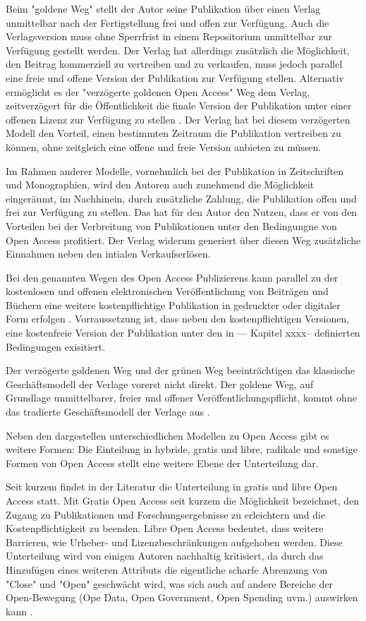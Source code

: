 Beim "goldene Weg" stellt der Autor seine Publikation über einen Verlag unmittelbar nach der Fertigstellung frei und offen zur Verfügung. Auch die Verlagsversion muss ohne Sperrfrist in einem Repositorium unmittelbar zur Verfügung gestellt werden. Der Verlag hat allerdings zusätzlich die Möglichkeit, den Beitrag kommerziell zu vertreiben und zu verkaufen, muss jedoch parallel eine freie und offene Version der Publikation zur Verfügung stellen. Alternativ ermöglicht es der "verzögerte goldenen Open Access" Weg dem Verlag, zeitverzögert für die Öffentlichkeit die finale Version der Publikation unter einer offenen Lizenz zur Verfügung zu stellen \cite{lewis_2012_inevitability}. Der Verlag hat bei diesem verzögerten Modell den Vorteil, einen bestimmten Zeitraum die Publikation vertreiben zu können, ohne zeitgleich eine offene und freie Version anbieten zu müssen.

Im Rahmen anderer Modelle, vornehmlich bei der Publikation in Zeitschriften und Monographien, wird den Autoren auch zunehmend die Möglichkeit eingeräumt, im Nachhinein, durch zusätzliche Zahlung, die Publikation offen und frei zur Verfügung zu stellen\cite{lewis_2012_inevitability}. Das hat für den Autor den Nutzen, dass er von den Vorteilen bei der Verbreitung von Publikationen unter den Bedingungne von Open Access profitiert. Der Verlag widerum generiert über diesen Weg zusätzliche Einnahmen neben den intialen Verkaufserlösen.

Bei den genannten Wegen des Open Access Publizierens kann parallel zu der kostenlosen und offenen elektronischen Veröffentlichung von Beiträgen und Büchern eine weitere kostenpflichtige Publikation in gedruckter oder digitaler Form erfolgen \cite{suchen}. Vorraussetzung ist, dass neben den kostenpflichtigen Versionen, eine kostenfreie Version der Publikation unter den in --- Kapitel xxxx-- definierten Bedingungen exisitiert.

Der verzögerte goldenen Weg und der grünen Weg beeinträchtigen das klassische Geschäftsmodell der Verlage vorerst nicht direkt. Der goldene Weg, auf Grundlage unmittelbarer, freier und offener Veröffentlichungspflicht, kommt ohne das tradierte Geschäftsmodell der Verlage aus \cite{lewis_2012_inevitability}.

Neben den dargestellen unterschiedlichen Modellen zu Open Access gibt es weitere Formen: Die Einteilung in hybride, gratis und libre, radikale und sonstige Formen von Open Access stellt eine weitere Ebene der Unterteilung dar.

Seit kurzem findet in der Literatur die Unterteilung in gratis und libre Open Access statt. Mit Gratis Open Access seit kurzem die Möglichkeit bezeichnet, den Zugang zu Publikationen und Forschungsergebnisse zu erleichtern und die Kostenpflichtigkeit zu beenden. Libre Open Access bedeutet, dass weitere Barrieren, wie Urheber- und Lizenzbeschränkungen aufgehoben werden. \cite{Adema_2014_open_access} Diese Unterteilung wird von einigen Autoren nachhaltig kritisiert, da durch das Hinzufügen eines weiteren Attributs die eigentliche scharfe Abrenzung von "Close" und "Open" geschwächt wird, was sich auch auf andere Bereiche der Open-Bewegung (Ope Data, Open Government, Open Spending uvm.) auswirken kann \cite{suchen}.

